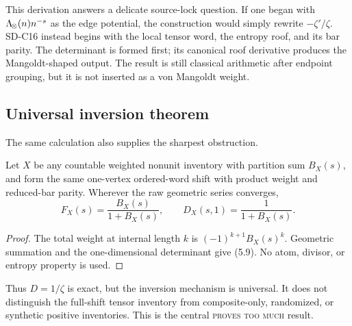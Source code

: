 This derivation answers a delicate source-lock question.  If one began with
$\Lambda_{\!\otimes}(n)n^{-s}$ as the edge potential, the construction would simply
rewrite $-\zeta'/\zeta$.  SD-C16 instead begins with the local tensor word,
the entropy roof, and its bar parity.  The determinant is formed first; its
canonical roof derivative produces the Mangoldt-shaped output.  The result is
still classical arithmetic after endpoint grouping, but it is not inserted
as a von Mangoldt weight.

\subsection{Universal inversion theorem}

The same calculation also supplies the sharpest obstruction.

\begin{proposition}
\label{prop:universal}
Let $X$ be any countable weighted nonunit inventory with partition sum
$B_X(s)$, and form the same one-vertex ordered-word shift with product weight
and reduced-bar parity.  Wherever the raw geometric series converges,
\[
  F_X(s)=\frac{B_X(s)}{1+B_X(s)},
  \qquad
  D_X(s,1)=\frac1{1+B_X(s)}.
  \tag{5.9}
\]
\end{proposition}

\begin{proof}
The total weight at internal length $k$ is
$(-1)^{k+1}B_X(s)^k$.  Geometric summation and the one-dimensional
determinant give (5.9).  No atom, divisor, or entropy property is used.
\end{proof}

Thus $D=1/\zeta$ is exact, but the inversion mechanism is universal.  It
does not distinguish the full-shift tensor inventory from composite-only,
randomized, or synthetic positive inventories.  This is the central
\textsc{proves too much} result.

